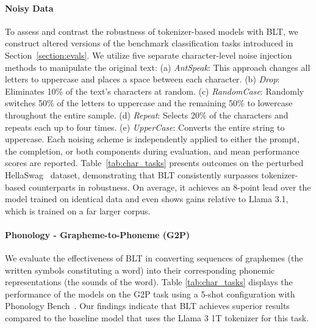 \paragraph{Noisy Data} To assess and contrast the robustness of tokenizer-based models with {\textsc BLT}, we construct altered versions of the benchmark classification tasks introduced in Section~\ref{section:evals}. We utilize five separate character-level noise injection methods to manipulate the original text: (a) \textit{AntSpeak}: This approach changes all letters to uppercase and places a space between each character. (b) \textit{Drop}: Eliminates 10\% of the text's characters at random. (c) \textit{RandomCase}: Randomly switches 50\% of the letters to uppercase and the remaining 50\% to lowercase throughout the entire sample. (d) \textit{Repeat}: Selects 20\% of the characters and repeats each up to four times. (e) \textit{UpperCase}: Converts the entire string to uppercase. Each noising scheme is independently applied to either the prompt, the completion, or both components during evaluation, and mean performance scores are reported. Table~\ref{tab:char_tasks} presents outcomes on the perturbed HellaSwag~\citep{Eval_hellaswag} dataset, demonstrating that {\textsc BLT} consistently surpasses tokenizer-based counterparts in robustness. On average, it achieves an 8-point lead over the model trained on identical data and even shows gains relative to Llama 3.1, which is trained on a far larger corpus.

\paragraph{Phonology - Grapheme-to-Phoneme (G2P)} We evaluate the effectiveness of {\textsc BLT} in converting sequences of graphemes (the written symbols constituting a word) into their corresponding phonemic representations (the sounds of the word). Table \ref{tab:char_tasks} displays the performance of the models on the G2P task using a 5-shot configuration with Phonology Bench~\citep{suvarna2024phonologybench}. Our findings indicate that {\textsc BLT} achieves superior results compared to the baseline model that uses the Llama 3 1T tokenizer for this task.

